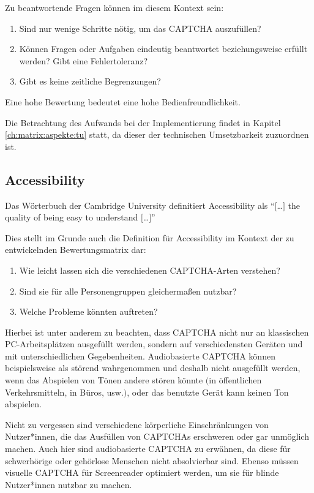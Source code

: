 Zu beantwortende Fragen können im diesem Kontext sein:
\begin{enumerate}
    \item Sind nur wenige Schritte nötig, um das CAPTCHA auszufüllen?
    \item Können Fragen oder Aufgaben eindeutig beantwortet beziehungsweise erfüllt werden? Gibt eine Fehlertoleranz?
    \item Gibt es keine zeitliche Begrenzungen?
\end{enumerate}

Eine hohe Bewertung bedeutet eine hohe Bedienfreundlichkeit. 

Die Betrachtung des Aufwands bei der Implementierung findet in Kapitel \ref{ch:matrix:aspekte:tu} statt, da dieser der technischen Umsetzbarkeit zuzuordnen ist.

\subsection{Accessibility}
\label{ch:matrix:aspekte:accessibility}
Das Wörterbuch der Cambridge University definitiert Accessibility als ``$[$\dots$]$ the quality of being easy to understand $[$\dots$]$'' \cite{CACD:2008}

Dies stellt im Grunde auch die Definition für Accessibility im Kontext der zu entwickelnden Bewertungsmatrix dar:

\begin{enumerate}
\item Wie leicht lassen sich die verschiedenen CAPTCHA-Arten verstehen?
\item Sind sie für alle Personengruppen gleichermaßen nutzbar?
\item Welche Probleme könnten auftreten?
\end{enumerate}

Hierbei ist unter anderem zu beachten, dass CAPTCHA nicht nur an klassischen PC-Arbeitsplätzen ausgefüllt werden,
sondern auf verschiedensten Geräten und mit unterschiedlichen Gegebenheiten.
Audiobasierte CAPTCHA können beispielsweise als störend wahrgenommen und deshalb nicht ausgefüllt werden,
wenn das Abspielen von Tönen andere stören könnte $($in öffentlichen Verkehrsmitteln, in Büros, usw.$)$,
oder das benutzte Gerät kann keinen Ton abspielen.

Nicht zu vergessen sind verschiedene körperliche Einschränkungen von Nutzer*innen,
die das Ausfüllen von CAPTCHAs erschweren oder gar unmöglich machen. Auch hier sind audiobasierte CAPTCHA zu erwähnen,
da diese für schwerhörige oder gehörlose Menschen nicht absolvierbar sind.
Ebenso müssen visuelle CAPTCHA für Screenreader optimiert werden, um sie für blinde Nutzer*innen nutzbar zu machen.

